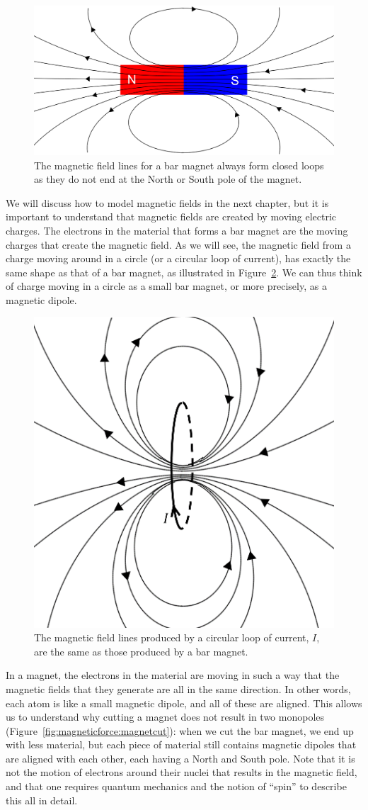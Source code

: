 \begin{figure}[!htbp]
\centering
\includegraphics[width=0.55\linewidth]{files/barfield-6229f75cb4409fdf87afdb0d239dbb7e.png}
\caption[]{The magnetic field lines for a bar magnet always form closed loops as they do not end at the North or South pole of the magnet.}
\label{fig:magneticforce:barfield}
\end{figure}

We will discuss how to model magnetic fields in the next chapter, but it is important to understand that magnetic fields are created by moving electric charges. The electrons in the material that forms a bar magnet are the moving charges that create the magnetic field. As we will see, the magnetic field from a charge moving around in a circle (or a circular loop of current), has exactly the same shape as that of a bar magnet, as illustrated in Figure~\ref{fig:magneticforce:loopfield}. We can thus think of charge moving in a circle as a small bar magnet, or more precisely, as a magnetic dipole.

\begin{figure}[!htbp]
\centering
\includegraphics[width=0.45\linewidth]{files/loopfield-c0b99f3b0aaa1c8e1f9f3ca5dc35a9a2.png}
\caption[]{The magnetic field lines produced by a circular loop of current, $I$, are the same as those produced by a bar magnet.}
\label{fig:magneticforce:loopfield}
\end{figure}

In a magnet, the electrons in the material are moving in such a way that the magnetic fields that they generate are all in the same direction. In other words, each atom is like a small magnetic dipole, and all of these are aligned. This allows us to understand why cutting a magnet does not result in two monopoles (Figure~\ref{fig:magneticforce:magnetcut}): when we cut the bar magnet, we end up with less material, but each piece of material still contains magnetic dipoles that are aligned with each other, each having a North and South pole. Note that it is not the motion of electrons around their nuclei that results in the magnetic field, and that one  requires quantum mechanics and the notion of ``spin'' to describe this all in detail.

